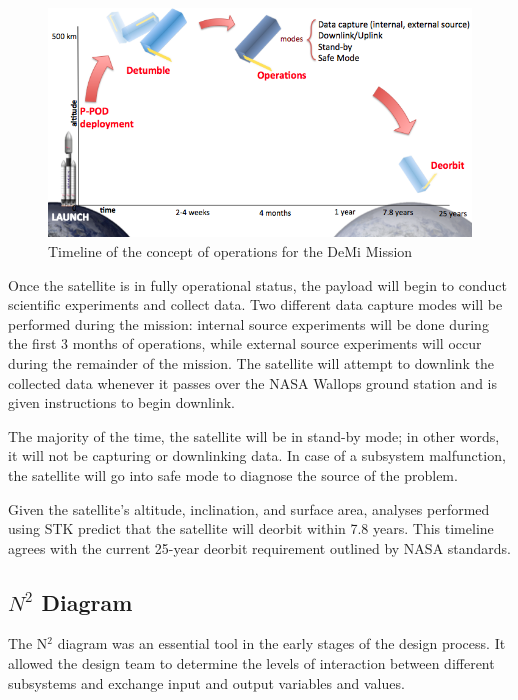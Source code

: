 \documentclass[12pt]{article}
\begin{document}
		
		\begin{figure}[!ht]
				\centering
				\includegraphics[width=5in]{images/MissionOverview_1.png}
				\caption{Timeline of the concept of operations for the DeMi Mission}
				\label{fig:Mission_ConOps}
			\end{figure}
		
		Once the satellite is in fully operational status, the payload will begin to conduct scientific experiments and collect data. Two different data capture modes will be performed during the mission: internal source experiments will be done during the first 3 months of operations, while external source experiments will occur during the remainder of the mission. The satellite will attempt to downlink the collected data whenever it passes over the NASA Wallops ground station and is given instructions to begin downlink.  

The majority of the time, the satellite will be in stand-by mode; in other words, it will not be capturing or downlinking data. In case of a subsystem malfunction, the satellite will go into safe mode to diagnose the source of the problem. 

Given the satellite’s altitude, inclination, and surface area, analyses performed using STK predict that the satellite will deorbit within 7.8 years. This timeline agrees with the current 25-year deorbit requirement outlined by NASA standards.\cite{nasa-deorbit}


\subsection{$N^2$ Diagram}
		
		The N$^2$ diagram was an essential tool in the early stages of the design process. It allowed the design team to determine the levels of interaction between different subsystems and exchange input and output variables and values. 
		
\end{document}

